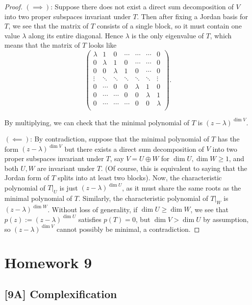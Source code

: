 \documentclass{article}
\begin{document}
\begin{proof}
$(\implies)$: Suppose there does not exist a direct sum decomposition of $V$ into two proper subspaces invariant under $T$. Then after fixing a Jordan basis for $T$, we see that the matrix of $T$ consists of a single block, so it must contain one value $\lambda$ along its entire diagonal. Hence $\lambda$ is the only eigenvalue of $T$, which means that the matrix of $T$ looks like 
$$\begin{pmatrix}
\lambda & 1 & 0 & \cdots & \cdots & \cdots & 0 \\
0 & \lambda & 1 & 0 &\cdots & \cdots & 0 \\
0 & 0 & \lambda & 1 & 0 & \cdots & 0 \\
\vdots & \ddots & \ddots & \ddots & \ddots & \ddots & \vdots \\
0 & \cdots & 0 & 0 &  \lambda & 1& 0 \\
0 & \cdots & \cdots & 0 & 0 & \lambda & 1 \\
0 & \cdots & \cdots & \cdots & 0 & 0 & \lambda \\
\end{pmatrix}.$$

By multiplying, we can check that the minimal polynomial of $T$ is $(z-\lambda)^{\dim V}$.

$(\impliedby)$: By contradiction, suppose that the minimal polynomial of $T$ has the form $(z-\lambda)^{\dim V}$ but there exists a direct sum decomposition of $V$ into two proper subspaces invariant under $T$, say $V = U \oplus W$ for $\dim U, \dim W \geq 1$, and both $U, W$ are invariant under $T$. (Of course, this is equivalent to saying that the Jordan form of $T$ splits into at least two blocks). Now, the characteristic polynomial of $T|_U$ is just $(z - \lambda)^{\dim U}$, as it must share the same roots as the minimal polynomial of $T$. Similarly, the characteristic polynomial of $T|_W$ is $(z-\lambda)^{\dim W}$. Without loss of generality, if $\dim U \geq \dim W$, we see that $p(z) := (z-\lambda)^{\dim U}$ satisfies $p(T) = 0$, but $\dim V > \dim U$ by assumption, so $(z-\lambda)^{\dim V}$ cannot possibly be minimal, a contradiction.
\end{proof}
\section*{Homework 9}
\subsection*{[9A] Complexification}
\end{document}
